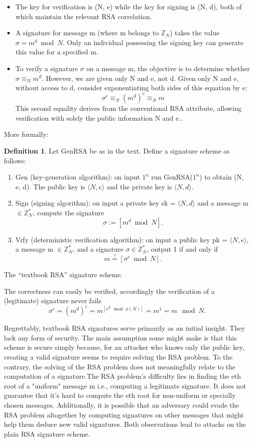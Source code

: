 \documentclass[]{final_report}
\theoremstyle{definition}
\newtheorem{definition}{Definition}[chapter]
\begin{document}
\begin{itemize}
    \item The key for verification is (N, e) while the key for signing is (N, d), both of which maintain the relevant RSA correlation.
    \item A signature for message m (where m belongs to $\mathbb{Z}_{N}$) takes the value $\sigma = m^d \bmod N$. Only an individual possessing the signing key can generate this value for a specified m. 
    \item To verify a signature $\sigma$ on a message m, the objective is to determine whether $\sigma \equiv_{N} m^d$.
However, we are given only N and e, not d. Given only N and e, without access to d, consider exponentiating both sides of this equation by e:
\[\sigma^e \equiv_{N} (m^d)^e \equiv_{N} m\]
This second equality derives from the conventional RSA attribute, allowing verification with solely the public information N and e..
\end{itemize}
More formally:
\begin{definition}
\label{def:textbook rsa}
Let GenRSA be as in the text. Define a signature scheme as follows:
\begin{enumerate}
    \item Gen (key-generation algorithm): on input $1^n$ run GenRSA($1^n$) to obtain (N, e, d). The public key is $\langle N, e \rangle$ and the private key is $\langle N, d \rangle$.

    \item Sign (signing algorithm): on input a private key sk = $\langle N, d \rangle$ and a message m $\in \mathbb{Z}^*_{N}$, compute the signature
\[\sigma := [m^d \bmod N].\]
    \item Vrfy (deterministic verification algorithm):  on input a public key pk = $\langle N, e \rangle$, a message m $\in \mathbb{Z}^*_{N}$, and a signature $\sigma \in \mathbb{Z}^*_{N}$, output 1 if and only if
    \[m \stackrel{?}{=} [\sigma^e \bmod N].\]
\end{enumerate}
The “textbook RSA” signature scheme.
\end{definition}
The correctness can easily be verified, accordingly the verification of a (legitimate) signature never fails
\[\sigma^e = (m^d)^e = m^{[e^{d}\mod \phi(N)]} = m^1 = m\mod N.\]

Regrettably, textbook RSA signatures serve primarily as an initial insight. They lack any form of security. The main assumption some might make is that this scheme is secure simply because, for an attacker who knows only the public key, creating a valid signature seems to require solving the RSA problem. To the contrary, the solving of the RSA problem does not meaningfully relate to the computation of a signature.The RSA problem's difficulty lies in finding the eth root of a "uniform" message m i.e., computing a legitimate signature. It does not guarantee that it's hard to compute the eth root for non-uniform or specially chosen messages. Additionally, it is possible that an adversary could evade the RSA problem altogether by computing signatures on other messages that might help them deduce new valid signatures. Both observations lead to attacks on the plain RSA signature scheme. 
\end{document}
